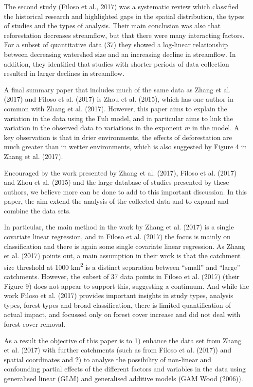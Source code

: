 \documentclass[]{elsarticle} %
\begin{document}
The second study (Filoso et al., 2017) was a systematic review which classified the historical research and highlighted gaps in the spatial distribution, the types of studies and the types of analysis. Their main conclusion was also that reforestation decreases streamflow, but that there were many interacting factors. For a subset of quantitative data (37) they showed a log-linear relationship between decreasing watershed size and an increasing decline in streamflow. In addition, they identified that studies with shorter periods of data collection resulted in larger declines in streamflow.

A final summary paper that includes much of the same data as Zhang et al. (2017) and Filoso et al. (2017) is Zhou et al. (2015), which has one author in common with Zhang et al. (2017). However, this paper aims to explain the variation in the data using the Fuh model, and in particular aims to link the variation in the observed data to variations in the exponent \emph{m} in the model. A key observation is that in drier environments, the effects of deforestation are much greater than in wetter environments, which is also suggested by Figure 4 in Zhang et al. (2017).

Encouraged by the work presented by Zhang et al. (2017), Filoso et al. (2017) and Zhou et al. (2015) and the large database of studies presented by these authors, we believe more can be done to add to this important discussion. In this paper, the aim extend the analysis of the collected data and to expand and combine the data sets.

In particular, the main method in the work by Zhang et al. (2017) is a single covariate linear regression, and in Filoso et al. (2017) the focus is mainly on classification and there is again some single covariate linear regression. As Zhang et al. (2017) points out, a main assumption in their work is that the catchment size threshold at 1000 km\textsuperscript{2} is a distinct separation between ``small'' and ``large'' catchments. However, the subset of 37 data points in Filoso et al. (2017) (their Figure 9) does not appear to support this, suggesting a continuum. And while the work Filoso et al. (2017) provides important insights in study types, analysis types, forest types and broad classification, there is limited quantification of actual impact, and focussed only on forest cover increase and did not deal with forest cover removal.

As a result the objective of this paper is to 1) enhance the data set from Zhang et al. (2017) with further catchments (such as from Filoso et al. (2017)) and spatial coordinates and 2) to analyse the possibility of non-linear and confounding partial effects of the different factors and variables in the data using generalised linear (GLM) and generalised additive models (GAM Wood (2006)).
\end{document}
